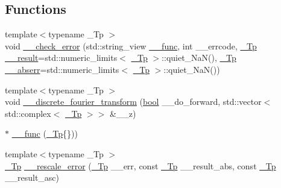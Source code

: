 \subsection*{Functions}
\begin{DoxyCompactItemize}
\item 
{\footnotesize template$<$typename \+\_\+\+Tp $>$ }\\void \hyperlink{namespace____gnu__cxx_a370fd142548c2e9e39e69282b4603317}{\+\_\+\+\_\+check\+\_\+error} (std\+::string\+\_\+view \hyperlink{namespace____gnu__cxx_af2b2f0c7a2ae72b922b1afefae5a65b2}{\+\_\+\+\_\+func}, int \+\_\+\+\_\+errcode, \hyperlink{namespace____gnu__cxx_a3b19a9c800ca194374ef9172290f7d79}{\+\_\+\+Tp} \hyperlink{namespace____gnu__cxx_a500ea9f53aeaecd8c2ae657503450578}{\+\_\+\+\_\+result}=std\+::numeric\+\_\+limits$<$ \hyperlink{namespace____gnu__cxx_a3b19a9c800ca194374ef9172290f7d79}{\+\_\+\+Tp} $>$\+::quiet\+\_\+\+NaN(), \hyperlink{namespace____gnu__cxx_a3b19a9c800ca194374ef9172290f7d79}{\+\_\+\+Tp} \hyperlink{namespace____gnu__cxx_a72f736cff127f1574e91a301de9e074b}{\+\_\+\+\_\+abserr}=std\+::numeric\+\_\+limits$<$ \hyperlink{namespace____gnu__cxx_a3b19a9c800ca194374ef9172290f7d79}{\+\_\+\+Tp} $>$\+::quiet\+\_\+\+NaN())
\item 
{\footnotesize template$<$typename \+\_\+\+Tp $>$ }\\void \hyperlink{namespace____gnu__cxx_a6dff31b609fa2f8678c729d557dbae49}{\+\_\+\+\_\+discrete\+\_\+fourier\+\_\+transform} (\hyperlink{namespace____gnu__cxx_ae83aca57f97767d5d09188718728a0ac}{bool} \+\_\+\+\_\+do\+\_\+forward, std\+::vector$<$ std\+::complex$<$ \hyperlink{namespace____gnu__cxx_a3b19a9c800ca194374ef9172290f7d79}{\+\_\+\+Tp} $>$$>$ \&\+\_\+\+\_\+z)
\item 
$\ast$ \hyperlink{namespace____gnu__cxx_af2b2f0c7a2ae72b922b1afefae5a65b2}{\+\_\+\+\_\+func} (\hyperlink{namespace____gnu__cxx_a3b19a9c800ca194374ef9172290f7d79}{\+\_\+\+Tp}\{\}))
\item 
{\footnotesize template$<$typename \+\_\+\+Tp $>$ }\\\hyperlink{namespace____gnu__cxx_a3b19a9c800ca194374ef9172290f7d79}{\+\_\+\+Tp} \hyperlink{namespace____gnu__cxx_aeff8a54364ae3976f593b8699626a897}{\+\_\+\+\_\+rescale\+\_\+error} (\hyperlink{namespace____gnu__cxx_a3b19a9c800ca194374ef9172290f7d79}{\+\_\+\+Tp} \+\_\+\+\_\+err, const \hyperlink{namespace____gnu__cxx_a3b19a9c800ca194374ef9172290f7d79}{\+\_\+\+Tp} \+\_\+\+\_\+result\+\_\+abs, const \hyperlink{namespace____gnu__cxx_a3b19a9c800ca194374ef9172290f7d79}{\+\_\+\+Tp} \+\_\+\+\_\+result\+\_\+asc)
$$
\end{DoxyCompactItemize}
